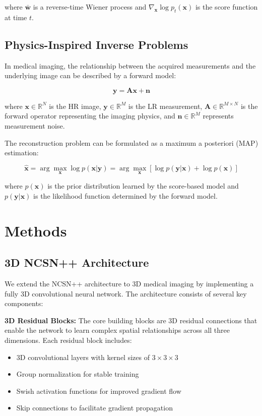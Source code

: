 \documentclass{midl} %
\begin{document}
where $\bar{\mathbf{w}}$ is a reverse-time Wiener process and $\nabla_{\mathbf{x}} \log p_t(\mathbf{x})$ is the score function at time $t$.

\subsection{Physics-Inspired Inverse Problems}

In medical imaging, the relationship between the acquired measurements and the underlying image can be described by a forward model:

\begin{equation}
\mathbf{y} = \mathbf{A}\mathbf{x} + \mathbf{n}
\end{equation}

where $\mathbf{x} \in \mathbb{R}^N$ is the HR image, $\mathbf{y} \in \mathbb{R}^M$ is the LR measurement, $\mathbf{A} \in \mathbb{R}^{M \times N}$ is the forward operator representing the imaging physics, and $\mathbf{n} \in \mathbb{R}^M$ represents measurement noise.

The reconstruction problem can be formulated as a maximum a posteriori (MAP) estimation:

\begin{equation}
\hat{\mathbf{x}} = \arg\max_{\mathbf{x}} \log p(\mathbf{x}|\mathbf{y}) = \arg\max_{\mathbf{x}} [\log p(\mathbf{y}|\mathbf{x}) + \log p(\mathbf{x})]
\end{equation}

where $p(\mathbf{x})$ is the prior distribution learned by the score-based model and $p(\mathbf{y}|\mathbf{x})$ is the likelihood function determined by the forward model.

\section{Methods}

\subsection{3D NCSN++ Architecture}

We extend the NCSN++ architecture to 3D medical imaging by implementing a fully 3D convolutional neural network. The architecture consists of several key components:

\textbf{3D Residual Blocks:} The core building blocks are 3D residual connections that enable the network to learn complex spatial relationships across all three dimensions. Each residual block includes:
\begin{itemize}
\item 3D convolutional layers with kernel sizes of $3 \times 3 \times 3$
\item Group normalization for stable training
\item Swish activation functions for improved gradient flow
\item Skip connections to facilitate gradient propagation
\end{itemize}
\end{document}
